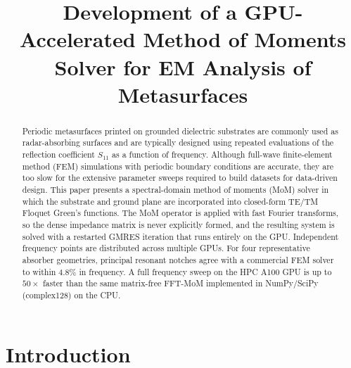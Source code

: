 \documentclass[10pt,conference]{IEEEtran}
\begin{document}
	
	\title{Development of a GPU-Accelerated Method of Moments Solver for EM Analysis of Metasurfaces}
	
	\providecommand{\IEEEauthorblockN}[1]{\authorblockN{#1}}
	\providecommand{\IEEEauthorblockA}[1]{\authorblockA{#1}}
	\author{\IEEEauthorblockN{.}
		\IEEEauthorblockA{.}}
	
	\maketitle
	
	\begin{abstract}
		Periodic metasurfaces printed on grounded dielectric substrates are
		commonly used as radar-absorbing surfaces and are typically designed using
		repeated evaluations of the reflection coefficient $S_{11}$ as a function
		of frequency. Although full-wave finite-element method (FEM) simulations
		with periodic boundary conditions are accurate, they are too slow for the
		extensive parameter sweeps required to build datasets for data-driven
		design. This paper presents a spectral-domain method of moments (MoM)
		solver in which the substrate and ground plane are incorporated into
		closed-form TE/TM Floquet Green's functions. The MoM operator is applied
		with fast Fourier transforms, so the dense impedance matrix is never
		explicitly formed, and the resulting system is solved with a restarted
		GMRES iteration that runs entirely on the GPU. Independent frequency
		points are distributed across multiple GPUs. For four representative
		absorber geometries, principal resonant notches agree with a
		commercial FEM solver to within $4.8\%$ in frequency. A full
		frequency sweep on the HPC A100 GPU is up to $50\times$ faster than the
		same matrix-free FFT-MoM implemented in NumPy/SciPy (complex128) on the
		CPU.
	\end{abstract}
	
	\section{Introduction}
	
\end{document}
